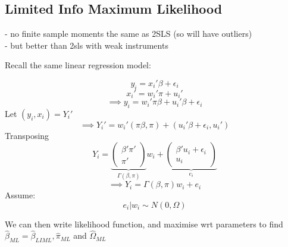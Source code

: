 \documentclass[DIV=14,titlepage=false]{scrreprt}
\begin{document}
\subsection{Limited Info Maximum Likelihood}
- no finite sample moments the same as 2SLS (so will have outliers)
\\ - but better than 2sls with weak instruments

Recall the same linear regression model:

\[y_i=x_i'\beta+\epsilon_i\]
\[x_i'=w_i'\pi+u_i'\]
\[\implies y_i=w_i'\pi\beta+u_i'\beta+\epsilon_i\]
Let \((y_i,x_i) = Y_i'\)
\[\implies Y_i'=w_i'(\pi\beta, \pi)+(u_i'\beta+\epsilon_i, u_i')\]
Transposing
\[Y_i=\underbrace{\begin{pmatrix} \beta'\pi' \\ \pi'\end{pmatrix}}_{\Gamma(\beta,\pi)}w_i+\underbrace{\begin{pmatrix} \beta'u_i+\epsilon_i \\ u_i\end{pmatrix}}_{e_i}\]
\[\implies Y_i=\Gamma(\beta,\pi)w_i+e_i\]
Assume:
\[e_i|w_i\sim N(0,\Omega)\]

We can then write likelihood function, and maximise wrt parameters to find
\(\hat \beta_{ML}=\hat \beta_{LIML}, \hat \pi_{ML}\) and \(\hat \Omega_{ML}\)
\end{document}
